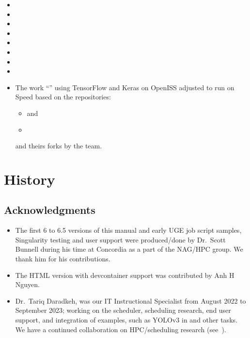 \documentclass{easychair}
\begin{document}
\begin{itemize}
	\item {}
	\item {}
	\item {}
	\item {}
	\item {}
	\item {}
	\item {}
	\item {}

	\item The work ``'' using TensorFlow and Keras on OpenISS
	adjusted to run on Speed based on the repositories:
	\begin{itemize}
		\item {} and
		\item {}
	\end{itemize}
	and theirs forks by the team.
\end{itemize}

\appendix

\section{History}

\subsection{Acknowledgments}
\label{sect:acks}

\begin{itemize}
	\item 
The first 6 to 6.5 versions of this manual and early UGE job script samples,
Singularity testing and user support were produced/done by Dr.~Scott Bunnell
during his time at Concordia as a part of the NAG/HPC group. We thank
him for his contributions.
	\item 
The HTML version with devcontainer support was contributed by Anh H Nguyen.
	\item 
Dr.~Tariq Daradkeh, was our IT Instructional Specialist from August 2022 to September 2023;
working on the scheduler, scheduling research, end user support, and integration of
examples, such as YOLOv3 in  and other tasks. We have a continued
collaboration on HPC/scheduling research (see~\cite{job-failure-prediction-compsysarch2024}).
\end{itemize}
\end{document}
